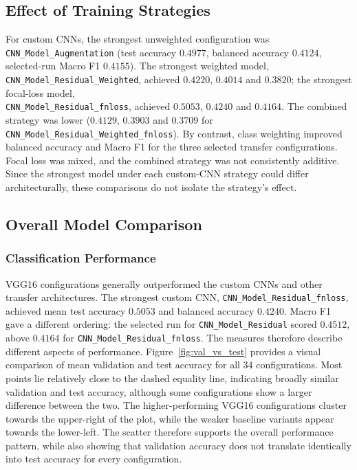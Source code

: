 \documentclass[10pt, a4paper]{article}
\let\oldsubsection\subsection
\renewcommand{\subsection}{%
    \Needspace{4\baselineskip}%
    \oldsubsection
}
\let\oldsubsubsection\subsubsection
\renewcommand{\subsubsection}{%
    \Needspace{4\baselineskip}%
    \oldsubsubsection
}
\begin{document}
		\subsection{Effect of Training Strategies}
		
			For custom CNNs, the strongest unweighted configuration was \texttt{CNN\_Model\_Augmentation} (test accuracy $0.4977$, balanced accuracy $0.4124$, selected-run Macro F1 $0.4155$). The strongest weighted model, \\\texttt{CNN\_Model\_Residual\_Weighted}, achieved $0.4220$, $0.4014$ and $0.3820$; the strongest focal-loss model, \\\texttt{CNN\_Model\_Residual\_fnloss}, achieved $0.5053$, $0.4240$ and $0.4164$. The combined strategy was lower ($0.4129$, $0.3903$ and $0.3709$ for \texttt{CNN\_Model\_Residual\_Weighted\_fnloss}). By contrast, class weighting improved balanced accuracy and Macro F1 for the three selected transfer configurations. Focal loss was mixed, and the combined strategy was not consistently additive. Since the strongest model under each custom-CNN strategy could differ architecturally, these comparisons do not isolate the strategy's effect.
		
		\subsection{Overall Model Comparison}
			
			\subsubsection{Classification Performance}
			
				VGG16 configurations generally outperformed the custom CNNs and other transfer architectures. The strongest custom CNN, \texttt{CNN\_Model\_Residual\_fnloss}, achieved mean test accuracy $0.5053$ and balanced accuracy $0.4240$. Macro F1 gave a different ordering: the selected run for \texttt{CNN\_Model\_Residual} scored $0.4512$, above $0.4164$ for \texttt{CNN\_Model\_Residual\_fnloss}. The measures therefore describe different aspects of performance. Figure~\ref{fig:val_vs_test} provides a visual comparison of mean validation and test accuracy for all 34 configurations. Most points lie relatively close to the dashed equality line, indicating broadly similar validation and test accuracy, although some configurations show a larger difference between the two. The higher-performing VGG16 configurations cluster towards the upper-right of the plot, while the weaker baseline variants appear towards the lower-left. The scatter therefore supports the overall performance pattern, while also showing that validation accuracy does not translate identically into test accuracy for every configuration.
				
\end{document}
